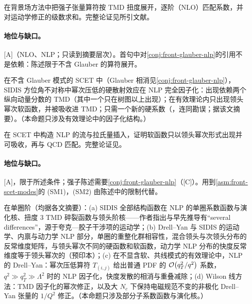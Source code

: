 \begin{proofsketch}
在背景场方法中把强子张量算符按 TMD 扭度展开，逐阶（NLO）匹配系数，并对运动学修正的级数求和。完整论证见所引文献。
\end{proofsketch}

\paragraph{地位与缺口。}[A]（NLO、NLP；只读到摘要层次）。首句中对\cref{conj:front-glauber-nlp}的引用不是依赖：陈述限于不含 Glauber 的算符展开。

\begin{proposition}\label{prop:front-sidis-nlp}
在不含 Glauber 模式的 SCET 中（Glauber 相消见\cref{conj:front-glauber-nlp}），SIDIS 方位角不对称中幂次压低的硬散射效应在 NLP 完全因子化：出现依赖两个纵向动量分数的 TMD（其中一个只在树图以上出现）；在有效理论内只出现领头幂次软函数，并被吸收进 TMD；只需一个新的硬系数（\cite{Ebert:2021jhy}，连同勘误；据该文摘要）。（本命题只涉及有效理论中的因子化结构。）
\end{proposition}

\begin{proofsketch}
在 SCET 中构造 NLP 的流与拉氏量插入，证明软函数只以领头幂次形式出现并可吸收，再与 QCD 匹配。完整论证见\cite{Ebert:2021jhy}。
\end{proofsketch}

\paragraph{地位与缺口。}[A]，限于所述条件；强子陈述需要\cref{conj:front-glauber-nlp}（[C]）。用到\cref{asm:front-scet-modes}的 (SM1)，(SM2) 由陈述中的限制代替。

\begin{proposition}\label{prop:front-nlp-tmd-oneloop}
在单圈阶（均据各文摘要）：(a) SIDIS 全部结构函数在 NLP 的单圈系数函数与演化核、扭度 3 TMD 碎裂函数与领头阶核——作者指出与早先推导有“several differences”，源于夸克—胶子干涉项的运动学\cite{Rodini:2023plb}；(b) Drell--Yan 与 SIDIS 的运动学、内禀与动力学 NLP 部分，单圈的重整化群相容性，混合领头与次领头分布的反常维度矩阵，与领头幂次不同的硬函数和软函数，动力学 NLP 分布的快度反常维度等于领头幂次的\cite{Gamberg:2022lju}（预印本）；(c) 在不显含软、共线模式的有效理论中，NLP 的 Drell--Yan：幂次压低算符 $T_{(i,j)}$ 给出普通 PDF 的 $\mathcal{O}\!\left(q_T^2/q^2\right)$ 系数，$q^2\gg q_T^2\gg\Lambda^2$ 时的 NLP 因子化，快度发散的相消与重叠减除\cite{Inglis-Whalen:2021bea}；(d) Wilson 线方法：TMD 因子化的幂次修正\cite{Balitsky:2017flc,Balitsky:2017gis}，以及大 $N_c$ 下保持电磁规范不变的非极化 Drell--Yan 张量的 $1/Q^2$ 修正\cite{Balitsky:2024ozy}。（本命题只涉及部分子系数函数与演化核。）
\end{proposition}

